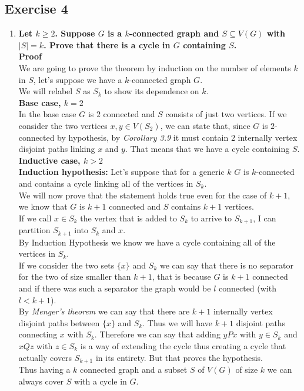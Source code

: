\subsection*{Exercise 4}
\begin{enumerate}[label=\textbf{(\alph*)}]    
    \boldmath
    \item \textbf{Let $k \geq 2$. Suppose $G$ is a $k$-connected graph and $S \subseteq V(G)$ with $|S| = k$. Prove that there is a cycle in $G$ containing $S$.\\\linebreak Proof\\}
    \unboldmath
    We are going to prove the theorem by induction on the number of elements $k$ in $S$, let's suppose we have a $k$-connected graph $G$.\\
    We will relabel $S$ as $S_k$ to show its dependence on $k$.\\\linebreak
    \boldmath
    \textbf{Base case, $k = 2$}\\
    \unboldmath
    In the base case $G$ is $2$ connected and $S$ consists of just two vertices. If we consider the two vertices $x, y \in V(S_2)$, we can state that, since $G$ is $2$-connected by hypothesis, by \textit{Corollary 3.9} it must contain $2$ internally vertex disjoint paths linking $x$ and $y$. That means that we have a cycle containing $S$.\\\linebreak
    \boldmath
    \textbf{Inductive case, $k > 2$}\\
    \unboldmath
    \textbf{Induction hypothesis:} Let's suppose that for a generic $k$ $G$ is $k$-connected and contains a cycle linking all of the vertices in $S_k$.\\
    We will now prove that the statement holds true even for the case of $k + 1$, we know that $G$ is $k + 1$ connected and $S$ contains $k + 1$ vertices.\\
    If we call $x \in S_k$ the vertex that is added to $S_k$ to arrive to $S_{k + 1}$, I can partition $S_{k + 1}$ into $S_k$ and $x$.\\
    By Induction Hypothesis we know we have a cycle containing all of the vertices in $S_k$.\\
    If we consider the two sets $\{x\}$ and $S_k$ we can say that there is no separator for the two of size smaller than $k + 1$, that is because $G$ is $k + 1$ connected and if there was such a separator the graph would be $l$ connected (with $l < k + 1$).\\
    By \textit{Menger's theorem} we can say that there are $k + 1$ internally vertex disjoint paths between $\{x\}$ and $S_k$. Thus we will have $k + 1$ disjoint paths connecting $x$ with $S_k$. Therefore we can say that adding $yPx$ with $y \in S_k$ and $xQz$ with $z \in S_k$ is a way of extending the cycle thus creating a cycle that actually covers $S_{k + 1}$ in its entirety. But that proves the hypothesis.\\\linebreak
    Thus having a $k$ connected graph and a subset $S$ of $V(G)$ of size $k$ we can always cover $S$ with a cycle in $G$.
    

\end{enumerate}

